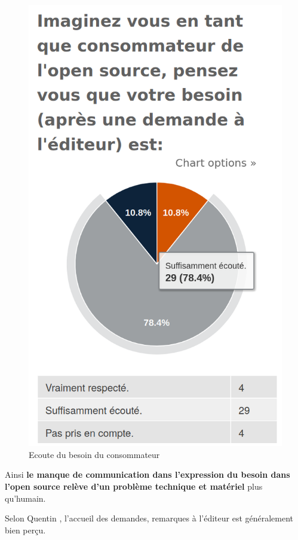 			\begin{figure}[!htb]
				\center
				\includegraphics[scale=0.28]{./img/a12}
				\caption{Ecoute du besoin du consommateur}
			\end{figure}

			Ainsi \textbf{le manque de communication dans l'expression du besoin dans l'open source relève d'un problème technique et matériel} plus qu'humain.

			\newpage

			Selon Quentin , l'accueil des demandes, remarques à l'éditeur est généralement bien perçu.

